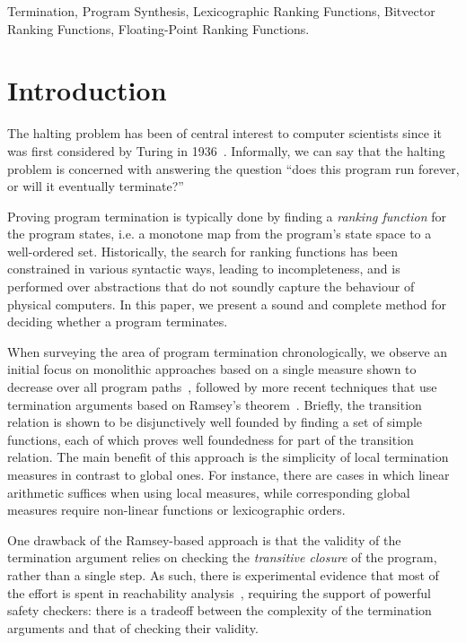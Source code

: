 \documentclass[preprint]{sigplanconf}
\theoremstyle{definition}
\begin{document}
\keywords
Termination, Program Synthesis, Lexicographic Ranking Functions, Bitvector Ranking Functions,
Floating-Point Ranking Functions.

\section{Introduction}\label{sec:intro}

The halting problem has been of central interest to computer scientists
since it was first considered by Turing in 1936~\cite{turing}.  Informally,
we can say that the halting problem is concerned with answering the question
``does this program run forever, or will it eventually terminate?''

Proving program termination is typically done by finding a \emph{ranking
function} for the program states, i.e.  a monotone map from the program's
state space to a well-ordered set.  Historically, the search for ranking
functions has been constrained in various syntactic ways, leading to
incompleteness, and is performed over abstractions that do not soundly
capture the behaviour of physical computers.  In this paper, we present a
sound and complete method for deciding whether a program terminates.

When surveying the area of program termination chronologically, we observe
an initial focus on monolithic approaches based on a single measure shown to
decrease over all program
paths~\cite{DBLP:conf/vmcai/P04,DBLP:conf/cav/BradleyMS05}, followed by more
recent techniques that use termination arguments based on Ramsey's
theorem~\cite{DBLP:conf/lpe/CodishG03,DBLP:conf/lics/PodelskiR04,DBLP:conf/pldi/CookPR06}. 
Briefly, the transition relation is shown to be disjunctively well founded
by finding a set of simple functions, each of which proves well foundedness
for part of the transition relation.  The main benefit of this approach is
the simplicity of local termination measures in contrast to global ones. 
For instance, there are cases in which linear arithmetic suffices when using
local measures, while corresponding global measures require non-linear
functions or lexicographic orders.

One drawback of the Ramsey-based approach is that the validity of the
termination argument relies on checking the \emph{transitive closure} of the
program, rather than a single step.  As such, there is experimental evidence
that most of the effort is spent in reachability
analysis~\cite{DBLP:conf/pldi/CookPR06,DBLP:conf/cav/KroeningSTW10},
requiring the support of powerful safety checkers: there is a tradeoff
between the complexity of the termination arguments and that of checking
their validity.
\end{document}
